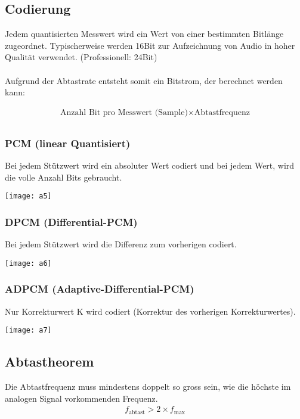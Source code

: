 \subsection{Codierung}
Jedem quantisierten Messwert wird ein Wert von einer bestimmten
Bitlänge zugeordnet. Typischerweise werden 16Bit zur Aufzeichnung von Audio in hoher
Qualität verwendet. (Professionell: 24Bit)
\\
\\
Aufgrund der Abtastrate entsteht somit ein Bitstrom, der berechnet
werden kann:

\begin{align*}
\text{Anzahl Bit pro Messwert (Sample)} \times \text{Abtastfrequenz} \\
\end{align*}

\subsubsection{PCM (linear Quantisiert)}
Bei jedem Stützwert wird ein absoluter Wert codiert und bei jedem Wert, wird die volle 
Anzahl Bits gebraucht.
\begin{center}
    \texttt{[image: a5]}
\end{center}
\subsubsection{DPCM (Differential-PCM)}
Bei jedem Stützwert wird die Differenz zum vorherigen codiert.
\begin{center}
    \texttt{[image: a6]}
\end{center}
\subsubsection{ADPCM (Adaptive-Differential-PCM)}
Nur Korrekturwert K wird codiert (Korrektur des vorherigen Korrekturwertes).
\begin{center}
    \texttt{[image: a7]}
\end{center}

\subsection{Abtastheorem}
Die Abtastfrequenz muss mindestens doppelt so gross sein, wie die höchste im analogen Signal 
vorkommenden Frequenz.
\begin{align*}
    f_{\text{abtast}} > 2 \times f_{\text{max}}
\end{align*}

